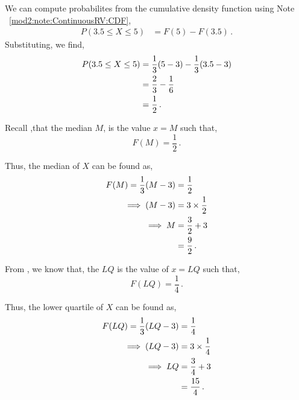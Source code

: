 \begin{subquestions}
\begin{subsubquestions}
We can compute probabilites from the cumulative density function using Note ~\ref{mod2:note:ContinuousRV:CDF}, 
\begin{align}
	P(3.5 \leq X \leq 5) & = F(5) - F(3.5)  \,.
\end{align}
Substituting, we find,
\begin{align}
	P(3.5 \leq X \leq 5) & = \frac{1}{3}(5-3) - \frac{1}{3}(3.5-3) \nonumber \\
	                     & = \frac{2}{3} - \frac{1}{6} \nonumber \\
	                     & = \frac{1}{2} \,.
\end{align}


\subsubquestion

Recall ,that the median $M$, is the value $x=M$ such that,
\begin{equation}
	F(M) = \frac{1}{2} \,.
\end{equation}

Thus, the median of $X$ can be found as,
\begin{align}
	F(M) = \frac{1}{3}(M-3) & = \frac{1}{2} \nonumber \\
	       \implies (M-3) & = 3 \times \frac{1}{2} \nonumber \\
	       \implies M & = \frac{3}{2} + 3 \nonumber \\
	                  & = \frac{9}{2} \,.
\end{align}


\subsubquestion

From , we know that, the $LQ$ is the value of $x=LQ$ such that,
\begin{equation}
	F(LQ) = \frac{1}{4} \,.
\end{equation}

Thus, the lower quartile of $X$ can be found as,
\begin{align}
	F(LQ) = \frac{1}{3}(LQ-3) & = \frac{1}{4} \nonumber \\
			 \implies (LQ-3) & = 3 \times \frac{1}{4} \nonumber \\
			     \implies LQ & = \frac{3}{4} + 3 \nonumber \\
				      	     & = \frac{15}{4} \,.
\end{align}

\end{subsubquestions}


\end{subquestions}
